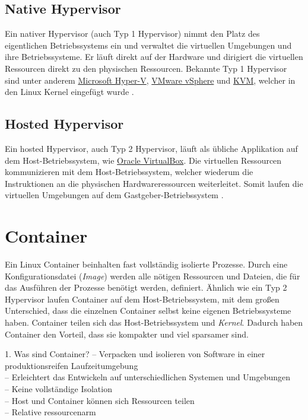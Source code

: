 \subsection{Native Hypervisor}
Ein nativer Hypervisor (auch Typ 1 Hypervisor) nimmt den Platz des eigentlichen Betriebssystems ein
und verwaltet die virtuellen Umgebungen und ihre Betriebssysteme. Er läuft direkt
auf der Hardware und dirigiert die virtuellen Ressourcen direkt zu den physischen Ressourcen.
Bekannte Typ 1 Hypervisor sind unter anderem
\href{https://docs.microsoft.com/de-de/virtualization/hyper-v-on-windows/}{Microsoft Hyper-V},
\href{https://www.vmware.com/de/products/vsphere.html}{VMware vSphere} und
\href{https://www.linux-kvm.org/page/Main_Page}{KVM}, welcher in den Linux
Kernel eingefügt wurde \cite{RedHatHypervisor}.

\subsection{Hosted Hypervisor}
Ein hosted Hypervisor, auch Typ 2 Hypervisor, läuft als übliche
Applikation auf dem Host-Betriebssystem,
wie \href{https://www.virtualbox.org/}{Oracle VirtualBox}.
Die virtuellen Ressourcen kommunizieren mit dem Host-Betriebssystem,
welcher wiederum die Instruktionen an die physischen Hardwareressourcen weiterleitet.
Somit laufen die virtuellen Umgebungen auf dem Gastgeber-Betriebssystem \cite{RedHatHypervisor}.

\section{Container}
Ein Linux Container beinhalten fast vollständig isolierte Prozesse.
Durch eine Konfigurationsdatei (\textit{Image}) werden alle nötigen Ressourcen und Dateien,
die für das Ausführen der Prozesse benötigt werden, definiert. Ähnlich wie ein Typ 2 Hypervisor
laufen Container auf dem Host-Betriebssystem, mit dem großen Unterschied, dass die einzelnen
Container selbst keine eigenen Betriebssysteme haben. Container teilen sich das
Host-Betriebssystem und \textit{Kernel}.
Dadurch haben Container den Vorteil, dass sie kompakter und viel sparsamer sind.

1. Was sind Container?
-- Verpacken und isolieren von Software in einer produktionsreifen Laufzeitumgebung\\
-- Erleichtert das Entwickeln auf unterschiedlichen Systemen und Umgebungen\\
-- Keine vollständige Isolation\\
-- Host und Container können sich Ressourcen teilen\\
-- Relative ressourcenarm\\

